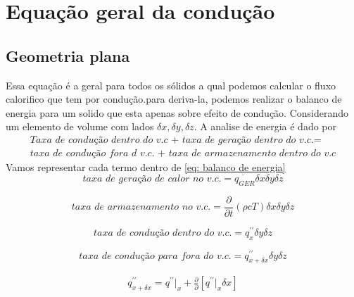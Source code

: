 \section{Equação geral da condução}
\subsection{Geometria plana}
Essa equação é a geral para todos os sólidos a qual podemos calcular o fluxo calorifico que 
tem por condução.para deriva-la, podemos realizar o balanco de energia para um solido que 
esta apenas sobre efeito de condução. Considerando um elemento de volume com lados 
\(\delta x, \delta y, \delta z\). A analise de energia é dado por 
\begin{equation}\label{eq: balanco de energia}
\begin{split}
    \textit{Taxa de condução dentro do v.c + taxa de geração dentro do v.c.}=\\
    \textit{taxa de condução fora d v.c. + taxa de armazenamento dentro do v.c}
\end{split}
\end{equation}
Vamos representar cada termo dentro de \eqref{eq: balanco de energia}
\begin{equation}\label{eq: calor gerado v.c.}
    \textit{taxa de geração de calor no v.c.}=\dot{q_{GER}}\delta x \delta y \delta z
\end{equation}

\begin{equation}\label{eq: calor armazenado v.c.}
    \textit{taxa de armazenamento no v.c.}=\frac{\partial}{\partial t}(\rho c T) \delta x \delta y \delta z
\end{equation}

\begin{equation}\label{eq: taxa de conducao dentro v.c.}
    \textit{taxa de condução dentro do v.c.}=q^{\prime \prime}_x \delta y \delta z
\end{equation}

\begin{equation}\label{eq: taxa de conducao fora v.c.}
    \textit{taxa de condução para fora do v.c.}= q^{\prime \prime}_{x+\delta x}\delta y \delta z
\end{equation}

\begin{align}
    q^{\prime \prime}_{x+\delta x}=q^{\prime \prime}|_x + \frac{\partial}{\partial}[q^{\prime \prime}|_x \delta x]
\end{align}

